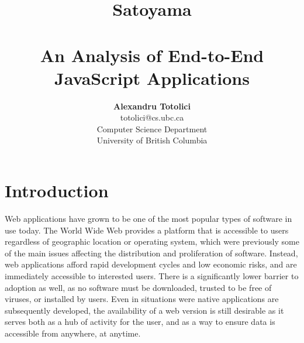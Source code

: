 \documentclass[letterpaper,twocolumn,10pt,draft]{article}
\begin{document}
\date{}

\title{\selectfont
    {\huge{\textbf{Satoyama}}}\\
    {\large{\textbf{\\An Analysis of End-to-End JavaScript Applications}}}}


\author{
{\rm \textbf{Alexandru Totolici}}\\
{\rm totolici@cs.ubc.ca}\\
Computer Science Department\\
University of British Columbia\\
} %

\maketitle

\thispagestyle{empty}

\begin{abstract}
\end{abstract}

\section{\label{sec:intro}Introduction}

Web applications have grown to be one of the most popular types of software in use today. The World Wide Web provides a platform that is accessible to users regardless of geographic location or operating system, which were previously some of the main issues affecting the distribution and proliferation of software. Instead, web applications afford rapid development cycles and low economic risks, and are immediately accessible to interested users. There is a significantly lower barrier to adoption as well, as no software must be downloaded, trusted to be free of viruses, or installed by users. Even in situations were native applications are subsequently developed, the availability of a web version is still desirable as it serves both as a hub of activity for the user, and as a way to ensure data is accessible from anywhere, at anytime.
\end{document}
